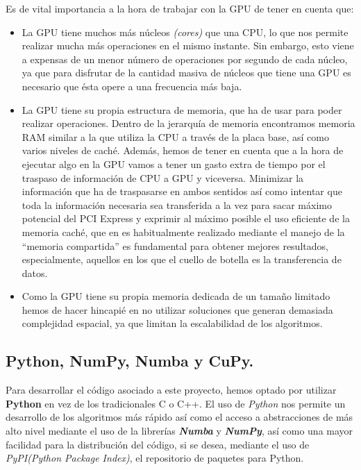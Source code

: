 Es de vital importancia a la hora de trabajar con la GPU de tener en cuenta que:\\
\begin{itemize}
    \item La GPU tiene muchos más núcleos \textit{(cores)} que una CPU, lo que nos permite realizar mucha más operaciones en el mismo instante. Sin embargo, esto viene a expensas de un menor número de operaciones por segundo de cada núcleo, ya que para disfrutar de la cantidad masiva de núcleos que tiene una GPU es necesario que ésta opere a una frecuencia más baja.

    \item La GPU tiene su propia estructura de memoria, que ha de usar para poder realizar operaciones. Dentro de la jerarquía de memoria encontramos memoria RAM similar a la que utiliza la CPU a través de la placa base, así como varios niveles de caché. Además, hemos de tener en cuenta que a la hora de ejecutar algo en la GPU vamos a tener un gasto extra de tiempo por el traspaso de información de CPU a GPU y viceversa. Minimizar la información que ha de traspasarse en ambos sentidos así como intentar que toda la información necesaria sea transferida a la vez para sacar máximo potencial del PCI Express y exprimir al máximo posible el uso eficiente de la memoria caché, que en \cuda es habitualmente realizado mediante el manejo de la ``memoria compartida'' es fundamental para obtener mejores resultados, especialmente, aquellos en los que el cuello de botella es la transferencia de datos.

    \item Como la GPU tiene su propia memoria dedicada de un tamaño limitado hemos de hacer hincapié en no utilizar soluciones que generan demasiada complejidad espacial, ya que limitan la escalabilidad de los algoritmos.
\end{itemize}

\subsection{Python, NumPy, Numba y CuPy.}
Para desarrollar el código asociado a este proyecto, hemos optado por utilizar \textbf{Python} en vez de los tradicionales C o C++. El uso de \textit{Python} nos permite un desarrollo de los algoritmos más rápido así como el acceso a abstracciones de más alto nivel mediante el uso de la librerías \textbf{\textit{Numba}} y \textbf{\textit{NumPy}},  así como una mayor facilidad para la distribución del código, si se desea, mediante el uso de \textit{PyPI(Python Package Index)}, el repositorio de paquetes para Python. \\

